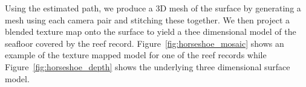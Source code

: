 Using the estimated path, we produce a 3D mesh of the surface by generating a mesh using each camera pair and stitching these together.  We then project a blended texture map onto the surface to yield a thee dimensional model of the seafloor covered by the reef record.  Figure~\ref{fig:horseshoe_mosaic} shows an example of the texture mapped model for one of the reef records while Figure~\ref{fig:horseshoe_depth} shows the underlying three dimensional surface model.